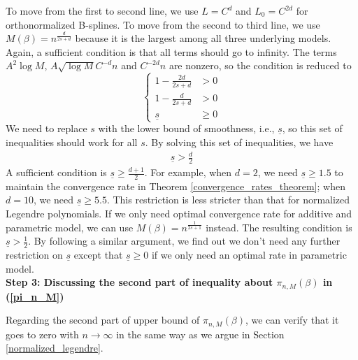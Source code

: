         To move from the first to second line, we use $L=C^d$ and $L_0=C^{2d}$ for orthonormalized B-splines. To move from the second to third line, we use $M(\beta)=n^{\frac{d}{2s+d}}$ because it is the largest among all three underlying models. Again, a sufficient condition is that all terms should go to infinity. The terms $A^2 \log M$, $A\sqrt{\log M}C^{-d}n$ and $C^{-2d}n$ are nonzero, so the condition is reduced to 
        \[
            \left\{
            \begin{array}{cc}
                1-\frac{2d}{2s+d} &> 0\\
                1-\frac{d}{2s+d} &> 0\\
                \underline{s} &\ge 0
            \end{array}
            \right.
        \]
        We need to replace $s$ with the lower bound of smoothness, i.e., $\underline{s}$, so this set of inequalities should work for all $s$. By solving this set of inequalities, we have
        \begin{align*}
            \underline{s} >\frac{d}{2}
        \end{align*}
        A sufficient condition is $\underline{s}\ge \frac{d+1}{2}$. For example, when $d=2$, we need $\underline{s}\ge1.5$ to maintain the convergence rate in Theorem \ref{convergence_rates_theorem}; when $d=10$, we need $\underline{s}\ge5.5$. This restriction is less stricter than that for normalized Legendre polynomials. If we only need optimal convergence rate for additive and parametric model, we can use $M(\beta)=n^{\frac{1}{2s+1}}$ instead. The resulting condition is $\underline{s}>\frac{1}{2}$. By following a similar argument, we find out we don't need any further restriction on $\underline{s}$ except that $\underline{s}\ge0$ if we only need an optimal rate in parametric model. \\

        \textbf{Step 3: Discussing the second part of inequality about $\pi_{n,M}(\beta)$ in (\ref{pi_n_M})}

        Regarding the second part of upper bound of $\pi_{n,M}(\beta)$, we can verify that it goes to zero with $n \rightarrow \infty$ in the same way as we argue in Section \ref{normalized_legendre}. 

